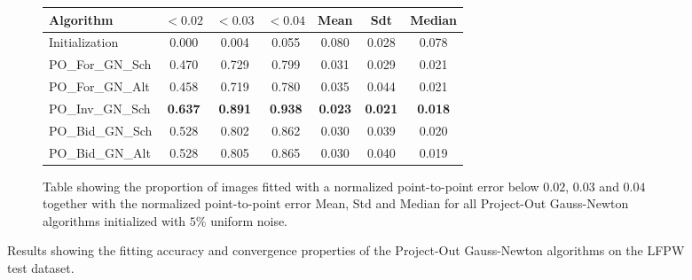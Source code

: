 \begin{figure}[p]
\begin{subfigure}{0.48\textwidth}
	    \label{fig:mean_cost_vs_iters2_po_gn_5}
	\end{subfigure}
	\par\bigskip\bigskip
	\begin{subfigure}{\textwidth}
		\center
		\begin{tabular}{lcccccc}
		    \toprule
		    Algorithm & $<0.02$ & $<0.03$ & $<0.04$ & Mean & Sdt & Median 
		    \\
		    \midrule
		    Initialization & 0.000 & 0.004 & 0.055 & 0.080 & 0.028 & 0.078
		    \\ 
		    PO\_For\_GN\_Sch & 0.470 & 0.729 & 0.799 & 0.031 & 0.029 & 0.021
		    \\
		    PO\_For\_GN\_Alt & 0.458 & 0.719 & 0.780 & 0.035 & 0.044 & 0.021
		    \\
		    PO\_Inv\_GN\_Sch & \textbf{0.637} & \textbf{0.891} & \textbf{0.938} & \textbf{0.023} & \textbf{0.021} & \textbf{0.018}
		    \\
		    PO\_Bid\_GN\_Sch & 0.528 & 0.802 & 0.862 & 0.030 & 0.039 & 0.020
		    \\
		    PO\_Bid\_GN\_Alt & 0.528 & 0.805 & 0.865 & 0.030 & 0.040 & 0.019
		    \\
		    \bottomrule
	  	\end{tabular}
	  	\caption{Table showing the proportion of images fitted with a normalized point-to-point error below $0.02$, $0.03$ and $0.04$ together with the normalized point-to-point error Mean, Std and Median for all Project-Out Gauss-Newton algorithms initialized with $5\%$ uniform noise.}
	    \label{tab:stats_po_gn_5}
	\end{subfigure}
	\caption{Results showing the fitting accuracy and convergence properties of the Project-Out Gauss-Newton algorithms on the LFPW test dataset.}
	\label{fig:po_gn_5}
\end{figure}


